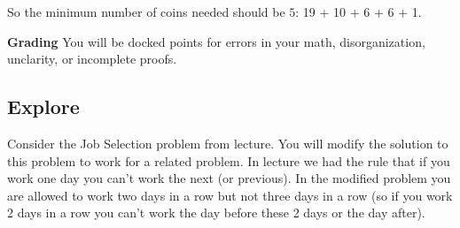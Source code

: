 \documentclass[paper=a4, fontsize=11pt]{scrartcl}
\numberwithin{equation}{section}		%
\numberwithin{figure}{section}			%
\numberwithin{table}{section}				%
\begin{document}
\begin{enumerate}
\begin{enumerate}
So the minimum number of coins needed should be $5$: 19 + 10 + 6 + 6 + 1. 


\end{enumerate}
\end{enumerate}

\noindent\textbf{Grading} You will be docked points for errors in your math, disorganization, unclarity, or incomplete proofs. 

\subsection{Explore}

Consider the Job Selection problem from lecture.  You will modify the solution to this problem to work for a related problem.  In lecture we had the rule that if you work one day you can't work the next (or previous).  In the modified problem you are allowed to work two days in a row but not three days in a row (so if you work 2 days in a row you can't work the day before these 2 days or the day after).
\end{document}
